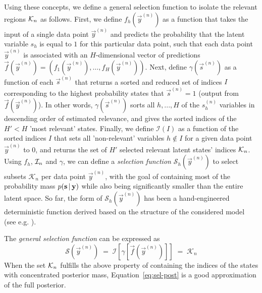 %
Using these concepts, we define a general selection function to isolate the relevant regions $\mathcal{K}_{n}$ as follows.
First, we define $f_h(\vec{y}^{(n)})$ as a function that takes the input of a single data
point $\vec{y}^{(n)}$ and predicts the probability that the latent variable
$s_h$ is equal to $1$ for this particular data point, such that each data point
$\vec{y}^{(n)}$ is associated with an $H$-dimensional vector of predictions
$\vec{f}(\vec{y}^{(n)}) = (f_1(\vec{y}^{(n)}), \dots, f_H(\vec{y}^{(n)}))$.
%
Next, define $\gamma(\vec{s}^{(n)})$ as a function of each
$\vec{s}^{(n)}$ that returns a sorted and reduced set of indices $I$ corresponding
to the highest probability states that $\vec{s}^{(n)}=1$ (output from $\vec{f}(\vec{y}^{(n)})$).
In other words, $\gamma(\vec{s}^{(n)})$
sorts all $h,...,H$ of the $s_h^{(n)}$ variables in descending order of estimated relevance, and gives the
sorted indices of the $H' < H$ 'most relevant' states.
%
Finally, we define $\mathcal{I}(I)$ as a function of the sorted indices $I$ that sets all 'non-relevant' variables $h\not\in I$ for a given data point $\vec{y}^{(n)}$ to $0$, and returns the set of $H'$ selected relevant latent states' indices $\mathcal{K}_{n}$.
%
%
%
Using $f_h$, $\mathcal{I}_{n}$ and $\gamma$, we can define a \emph{selection function}
$\mathcal{S}_h(\vec{y}^{(n)})$ to select subsets $\mathcal{K}_n$ per data point
$\vec{y}^{(n)}$, with the goal of containing most of the probability mass
$p({\mathbf{s}} \, | \, {\mathbf{y}})$ while also being significantly smaller than the entire
latent space.  So far, the form of $\mathcal{S}_h(\vec{y}^{(n)})$ has been
a hand-engineered deterministic function derived based on the structure of the considered model
(see e.g. \citep{SheltonEtAl2011, SheltonEtAl2012, DaiLucke2012a, DaiLucke2012b,
BornscheinEtAl2013, SheikhEtAl2014}).

The \textit{general selection function}  can be expressed as
%
\vspace{-.1cm}
\begin{equation}\label{eq:sel-func}
\mathcal{S}(\vec{y}^{(n)}) \;=\; \mathcal{I} \left[  \gamma \left[ \vec{f}(\vec{y}^{(n)}) \right]  \right] \;=\; \mathcal{K}_n
\end{equation}
%
When the set $\mathcal{K}_{n}$ fulfills the above property of containing the indices of the states with concentrated posterior mass, Equation~\eqref{eq:sel-post} is a good approximation of the full posterior.

